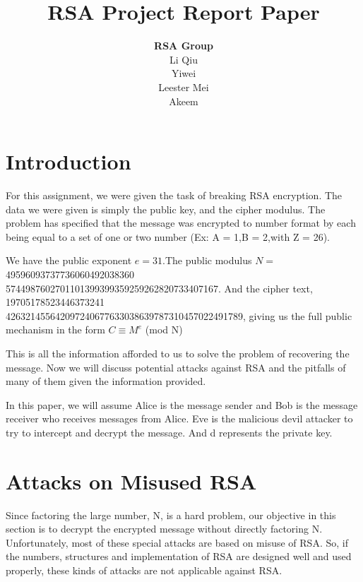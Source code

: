 \documentclass[12pt]{article} %
\title{RSA Project Report Paper}
\author{\textbf{RSA Group}\\Li Qiu\\Yiwei \\Leester Mei\\Akeem}
\begin{document}
\maketitle

\section{Introduction}
For this assignment, we were given the task of breaking RSA encryption. The data we were given is simply the public key, and the cipher modulus. The problem has specified that the message was encrypted to number format by each being equal to a set of one or two number (Ex: A = 1,B = 2,with Z = 26).

We have the public exponent $ e = 31 $.The public modulus $N=$  49596093737736060492038360\\5744987602701101399399359259262820733407167.
And the cipher text, 19705178523446373241\\426321455642097240677633038639787310457022491789, giving us the full public mechanism in the form $ C \equiv M^{e} $ (mod N) 

\indent This is all the information afforded to us to solve the problem of recovering the message. Now we will discuss potential attacks against RSA and the pitfalls of many of them given the information provided.

In this paper, we will assume Alice is the message sender and Bob is the message receiver who receives messages from Alice. Eve is the malicious devil attacker to try to intercept and decrypt the message. And d represents the private key.

\section{Attacks on Misused RSA}
	Since factoring the large number, N, is a hard problem, our objective in this section is to decrypt the encrypted message without directly factoring N.
	Unfortunately, most of these special attacks are based on misuse of RSA.
	So, if the numbers, structures and implementation of RSA are designed well and used properly, these kinds of attacks are not applicable against RSA.
\end{document}
